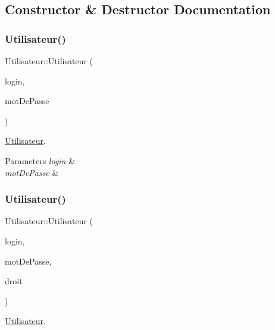 \subsection{Constructor \& Destructor Documentation}
\mbox{\label{class_utilisateur_a9c279c4e14b76e43412e1480f3cfa07e}} 
\subsubsection{\texorpdfstring{Utilisateur()}{Utilisateur()}\hspace{0.1cm}{\footnotesize\ttfamily [1/2]}}
{\footnotesize\ttfamily Utilisateur\+::\+Utilisateur (\begin{DoxyParamCaption}\item[{Q\+String}]{login,  }\item[{Q\+String}]{mot\+De\+Passe }\end{DoxyParamCaption})}



\mbox{\hyperlink{class_utilisateur}{Utilisateur}}. 


\begin{DoxyParams}{Parameters}
{\em login} & \\
\hline
{\em mot\+De\+Passe} & \\
\hline
\end{DoxyParams}
\mbox{\label{class_utilisateur_a14ac7e9bd12689670dc386393f86045f}} 
\subsubsection{\texorpdfstring{Utilisateur()}{Utilisateur()}\hspace{0.1cm}{\footnotesize\ttfamily [2/2]}}
{\footnotesize\ttfamily Utilisateur\+::\+Utilisateur (\begin{DoxyParamCaption}\item[{Q\+String}]{login,  }\item[{Q\+String}]{mot\+De\+Passe,  }\item[{int}]{droit }\end{DoxyParamCaption})}



\mbox{\hyperlink{class_utilisateur}{Utilisateur}}. 


